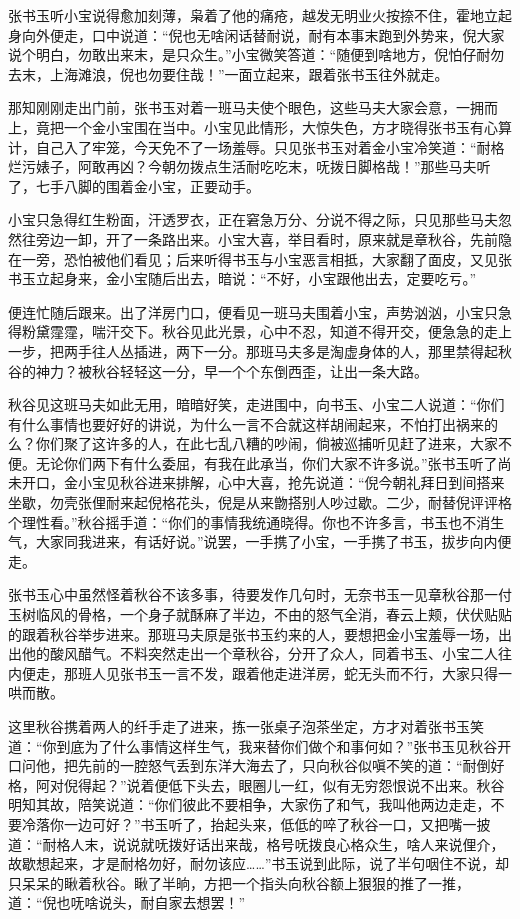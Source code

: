 \documentclass[12pt,UTF8]{ctexbook}
\begin{document}
{{{张书玉听小宝说得愈加刻薄，枭着了他的痛疮，越发无明业火按捺不住，霍地立起身向外便走，口中说道：“倪也无啥闲话替耐说，耐有本事末跑到外势来，倪大家说个明白，勿敢出来末，是只众生。”小宝微笑答道：“随便到啥地方，倪怕仔耐勿去末，上海滩浪，倪也勿要住哉！”一面立起来，跟着张书玉往外就走。

那知刚刚走出门前，张书玉对着一班马夫使个眼色，这些马夫大家会意，一拥而上，竟把一个金小宝围在当中。小宝见此情形，大惊失色，方才晓得张书玉有心算计，自己入了牢笼，今天免不了一场羞辱。只见张书玉对着金小宝冷笑道：“耐格烂污婊子，阿敢再凶？今朝勿拨点生活耐吃吃末，呒拨日脚格哉！”那些马夫听了，七手八脚的围着金小宝，正要动手。

小宝只急得红生粉面，汗透罗衣，正在窘急万分、分说不得之际，只见那些马夫忽然往旁边一卸，开了一条路出来。小宝大喜，举目看时，原来就是章秋谷，先前隐在一旁，恐怕被他们看见；后来听得书玉与小宝恶言相抵，大家翻了面皮，又见张书玉立起身来，金小宝随后出去，暗说：“不好，小宝跟他出去，定要吃亏。”

便连忙随后跟来。出了洋房门口，便看见一班马夫围着小宝，声势汹汹，小宝只急得粉黛霪霪，喘汗交下。秋谷见此光景，心中不忍，知道不得开交，便急急的走上一步，把两手往人丛插进，两下一分。那班马夫多是淘虚身体的人，那里禁得起秋谷的神力？被秋谷轻轻这一分，早一个个东倒西歪，让出一条大路。

秋谷见这班马夫如此无用，暗暗好笑，走进围中，向书玉、小宝二人说道：“你们有什么事情也要好好的讲说，为什么一言不合就这样胡闹起来，不怕打出祸来的么？你们聚了这许多的人，在此七乱八糟的吵闹，倘被巡捕听见赶了进来，大家不便。无论你们两下有什么委屈，有我在此承当，你们大家不许多说。”张书玉听了尚未开口，金小宝见秋谷进来排解，心中大喜，抢先说道：“倪今朝礼拜日到间搭来坐歇，勿壳张俚耐来起倪格花头，倪是从来朆搭别人吵过歇。二少，耐替倪评评格个理性看。”秋谷摇手道：“你们的事情我统通晓得。你也不许多言，书玉也不消生气，大家同我进来，有话好说。”说罢，一手携了小宝，一手携了书玉，拔步向内便走。

张书玉心中虽然怪着秋谷不该多事，待要发作几句时，无奈书玉一见章秋谷那一付玉树临风的骨格，一个身子就酥麻了半边，不由的怒气全消，春云上颊，伏伏贴贴的跟着秋谷举步进来。那班马夫原是张书玉约来的人，要想把金小宝羞辱一场，出出他的酸风醋气。不料突然走出一个章秋谷，分开了众人，同着书玉、小宝二人往内便走，那班人见张书玉一言不发，跟着他走进洋房，蛇无头而不行，大家只得一哄而散。

这里秋谷携着两人的纤手走了进来，拣一张桌子泡茶坐定，方才对着张书玉笑道：“你到底为了什么事情这样生气，我来替你们做个和事何如？”张书玉见秋谷开口问他，把先前的一腔怒气丢到东洋大海去了，只向秋谷似嗔不笑的道：“耐倒好格，阿对倪得起？”说着便低下头去，眼圈儿一红，似有无穷怨恨说不出来。秋谷明知其故，陪笑说道：“你们彼此不要相争，大家伤了和气，我叫他两边走走，不要冷落你一边可好？”书玉听了，抬起头来，低低的啐了秋谷一口，又把嘴一披道：“耐格人末，说说就呒拨好话出来哉，格号呒拨良心格众生，啥人来说俚介，故歇想起来，才是耐格勿好，耐勿该应……”书玉说到此际，说了半句咽住不说，却只呆呆的瞅着秋谷。瞅了半晌，方把一个指头向秋谷额上狠狠的推了一推，道：“倪也呒啥说头，耐自家去想罢！”

}}}
\end{document}
